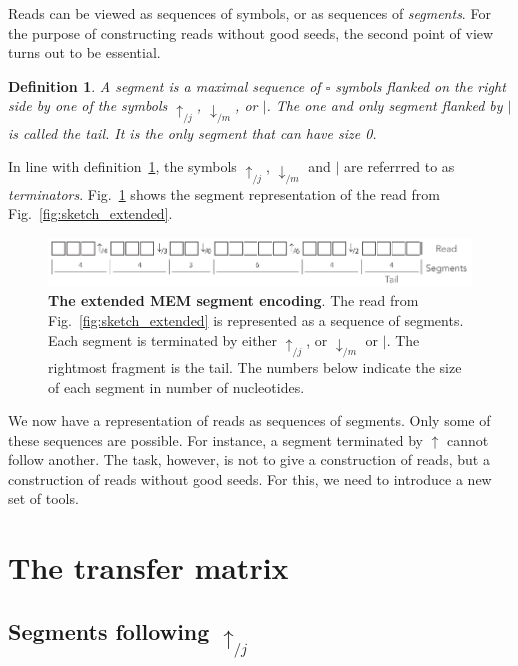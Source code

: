 \documentclass{article}
\newtheorem{definition}{Definition}
\begin{document}
Reads can be viewed as sequences of symbols, or as sequences of
\emph{segments}. For the purpose of constructing reads without good seeds,
the second point of view turns out to be essential.

\begin{definition}
\label{def:segment}
A segment is a maximal sequence of $\square$ symbols flanked on the right
side by one of the symbols $\uparrow_{/j}$, $\downarrow_{/m}$, or $|$. The
one and only segment flanked by $|$ is called the tail. It is the only
segment that can have size 0.
\end{definition}

In line with definition~\ref{def:segment}, the symbols $\uparrow_{/j}$,
$\downarrow_{/m}$ and $|$ are referrred to as \emph{terminators}.
Fig.~\ref{fig:sketch_segment} shows the segment representation of the read
from Fig.~\ref{fig:sketch_extended}.

\begin{figure}[h]
\centering
\includegraphics[scale=.85]{sketch_segments.pdf}
\caption{\textbf{The extended MEM segment encoding}.
The read from Fig.~\ref{fig:sketch_extended} is represented as a sequence
of segments. Each segment is terminated by either $\uparrow_{/j}$, or
$\downarrow_{/m}$ or $|$. The rightmost fragment is the tail. The numbers
below indicate the size of each segment in number of nucleotides.}
\label{fig:sketch_segment}
\end{figure}


We now have a representation of reads as sequences of segments. Only some
of these sequences are possible. For instance, a segment terminated by
$\uparrow$ cannot follow another. The task, however, is not to give a
construction of reads, but a construction of reads without good seeds. For
this, we need to introduce a new set of tools.



\section{The transfer matrix}
\label{sec:transfer_mat}



\subsection{Segments following $\uparrow_{/j}$}
\end{document}
